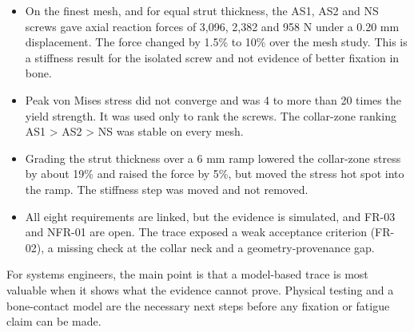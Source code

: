 \documentclass[10pt,twocolumn,letterpaper]{article}
\begin{document}
\begin{itemize}
\item[\textbf{(1)}] On the finest mesh, and for equal strut thickness, the AS1, AS2 and NS screws gave axial reaction forces of 3,096, 2,382 and 958 N under a 0.20 mm displacement. The force changed by 1.5\% to 10\% over the mesh study. This is a stiffness result for the isolated screw and not evidence of better fixation in bone.
\item[\textbf{(2)}] Peak von Mises stress did not converge and was 4 to more than 20 times the yield strength. It was used only to rank the screws. The collar-zone ranking AS1 > AS2 > NS was stable on every mesh.
\item[\textbf{(3)}] Grading the strut thickness over a 6 mm ramp lowered the collar-zone stress by about 19\% and raised the force by 5\%, but moved the stress hot spot into the ramp. The stiffness step was moved and not removed.
\item[\textbf{(4)}] All eight requirements are linked, but the evidence is simulated, and FR-03 and NFR-01 are open. The trace exposed a weak acceptance criterion (FR-02), a missing check at the collar neck and a geometry-provenance gap.
\end{itemize}
For systems engineers, the main point is that a model-based trace is most valuable when it shows what the evidence cannot prove. Physical testing and a bone-contact model are the necessary next steps before any fixation or fatigue claim can be made.
\end{document}
